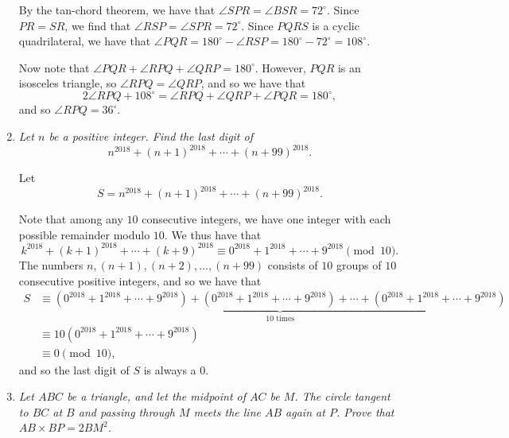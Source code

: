 \documentclass{article}
\begin{document}
\begin{enumerate}
By the tan-chord theorem, we have that $\angle SPR = \angle BSR = 72^\circ$. Since $PR = SR$, we find that $\angle RSP = \angle SPR = 72^\circ$. Since $PQRS$ is a cyclic quadrilateral, we have that $\angle PQR = 180^\circ - \angle RSP = 180^\circ - 72^\circ = 108^\circ$.

Now note that $\angle PQR + \angle RPQ + \angle QRP = 180^\circ$. However, $PQR$ is an isosceles triangle, so $\angle RPQ = \angle QRP$, and so we have that
\[
	2\angle RPQ + 108^\circ = \angle RPQ + \angle QRP + \angle PQR = 180^\circ,
\]
and so $\angle RPQ = 36^\circ$.


\vspace{12pt}
\item %
\textit{Let $n$ be a positive integer. Find the last digit of \[ n^{2018} +(n+1)^{2018} +\dotsb +(n+99)^{2018}. \]}

Let
\[
	S = n^{2018} + {(n + 1)}^{2018} + \cdots + {(n + 99)}^{2018}.
\]

Note that among any $10$ consecutive integers, we have one integer with each possible remainder modulo $10$. We thus have that
\[
	k^{2018} + {(k + 1)}^{2018} + \cdots + {(k + 9)}^{2018} \equiv 0^{2018} + 1^{2018} + \cdots + 9^{2018} \pmod{10}.
\]
The numbers $n, (n + 1), (n + 2), \dots, (n + 99)$ consists of $10$ groups of $10$ consecutive positive integers, and so we have that
\begin{align*}
	S & \equiv \underbrace{\left( 0^{2018} + 1^{2018} + \cdots + 9^{2018} \right) + \left( 0^{2018} + 1^{2018} + \cdots + 9^{2018} \right) + \cdots + \left( 0^{2018} + 1^{2018} + \cdots + 9^{2018} \right)}_{10 \text{ times}} \\
	& \equiv 10 \left( 0^{2018} + 1^{2018} + \cdots + 9^{2018} \right) \\
	& \equiv 0 \pmod{10},
\end{align*}
and so the last digit of $S$ is always a $0$.

\vspace{12pt}
\item %
\textit{Let $ABC$ be a triangle, and let the midpoint of $AC$ be $M$. The circle tangent to $BC$ at $B$ and passing through $M$ meets the line $AB$ again at $P$. Prove that $AB \times BP = 2 BM^2$.}


\end{enumerate}
\end{document}
